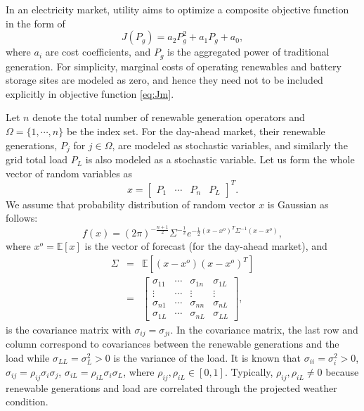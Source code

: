 \documentclass[conference]{IEEEtran}
\begin{document}
In an electricity market, utility aims to optimize a composite objective function in the form of 
\begin{equation} 
J(P_g) = a_2 P_g^2 + a_1 P_g + a_0, \label{eq:Jm}
\end{equation}
where $a_i$ are cost coefficients, and $P_g$ is the aggregated power of traditional generation. For simplicity, marginal costs of operating renewables and battery storage sites are modeled as zero, and hence they need not to be included explicitly in objective function \eqref{eq:Jm}. 

Let $n$ denote the total number of renewable generation operators and $\Omega=\{1,\cdots,n\}$ be the index set. For the day-ahead market, their renewable generations, $P_j$ for $j\in\Omega$, are modeled as stochastic variables, and similarly the grid total load $P_L$ is also modeled as a stochastic variable. Let us form the whole vector of random variables as 
\begin{equation} 
x = \begin{bmatrix} P_1 & \cdots & P_n & P_L \end{bmatrix}^T.  \label{eq:x}
\end{equation}
We assume that probability distribution of random vector $x$ is Gaussian as follows:
\[ f(x) = (2\pi)^{-\frac{n+1}{2}}\Sigma^{-\frac{1}{2}} e^{-\frac{1}{2}(x-x^o)^T\Sigma^{-1}(x-x^o)},  \]
where  $x^o=\mathbb{E}[x]$ is the vector of forecast (for the day-ahead market), and 
\begin{eqnarray*}
\Sigma & = & \mathbb{E}[(x-x^o)(x-x^o)^T] \\
& = & \begin{bmatrix} \sigma_{11} & \cdots & \sigma_{1n} & \sigma_{1L} \\ \vdots & \cdots & \vdots & \vdots \\ \sigma_{n1} & \cdots & \sigma_{nn} & \sigma_{nL} \\ \sigma_{1L} & \cdots & \sigma_{nL} & \sigma_{LL}
\end{bmatrix},  
\end{eqnarray*}
is the covariance matrix with $\sigma_{ij}=\sigma_{ji}$. In the covariance matrix, the last row and column correspond to covariances between the renewable generations and the load while $\sigma_{LL}=\sigma_L^2>0$ is the variance of the load. It is known that
$\sigma_{ii}=\sigma_i^2>0$, $\sigma_{ij}=\rho_{ij}\sigma_i\sigma_j$, $\sigma_{iL}=\rho_{iL}\sigma_i\sigma_L$, where $\rho_{ij},\rho_{iL}\in[0,1]$. Typically, $\rho_{ij},\rho_{iL}\not=0$ because renewable generations and load are correlated through the projected weather condition.
\end{document}
